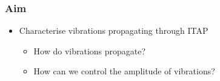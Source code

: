 \begin{frame}
    \frametitle{Aim}
    \begin{itemize}
        \item Characterise vibrations propagating through ITAP
        \begin{itemize}
            \item How do vibrations propagate?
            \item How can we control the amplitude of vibrations?
        \end{itemize} 
    \end{itemize}
\end{frame}